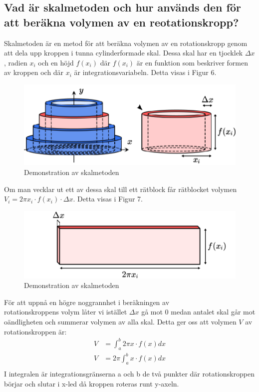 \documentclass[12pt]{article}
\begin{document}
\subsection*{Vad är skalmetoden och hur används den för att beräkna volymen av en reotationskropp?}
Skalmetoden är en metod för att beräkna volymen av en rotationskropp genom att dela upp kroppen i tunna cylinderformade skal. Dessa skal har en tjocklek $\Delta x$, radien $x_i$ och en höjd $f(x_i)$ där $f(x_i)$ är en funktion som beskriver formen av kroppen och där $x_i$ är integrationsvariabeln. Detta visas i Figur 6.
\begin{figure}[H]
    \centering
    \renewcommand{\thefigure}{6}
    \includegraphics[width=\textwidth]{figur6.png}
    \caption{Demonstration av skalmetoden}
\end{figure}
Om man vecklar ut ett av dessa skal till ett rätblock får rätblocket volymen $V_i=2\pi x_i\cdot f(x_i)\cdot \Delta x$. Detta visas i Figur 7.
\newpage
\begin{figure}[H]
    \centering
    \renewcommand{\thefigure}{7}
    \includegraphics[width=\textwidth]{figur7.png}
    \caption{Demonstration av skalmetoden}
\end{figure}
För att uppnå en högre noggrannhet i beräkningen av\\
rotationskroppens volym låter vi istället $\Delta x$ gå mot 0 medan antalet skal går mot oändligheten och summerar volymen av alla skal. Detta ger oss att volymen $V$ av 
rotationskroppen är:
\begin{align*}
    V&=\int_{a}^{b}2\pi x\cdot f(x) dx\\
    V&=2\pi\int_{a}^{b}x\cdot f(x) dx\\
\end{align*}
I integralen är integrationsgränserna a och b de två punkter där rotationskroppen börjar och slutar i x-led då kroppen roteras runt y-axeln.\\
\end{document}
